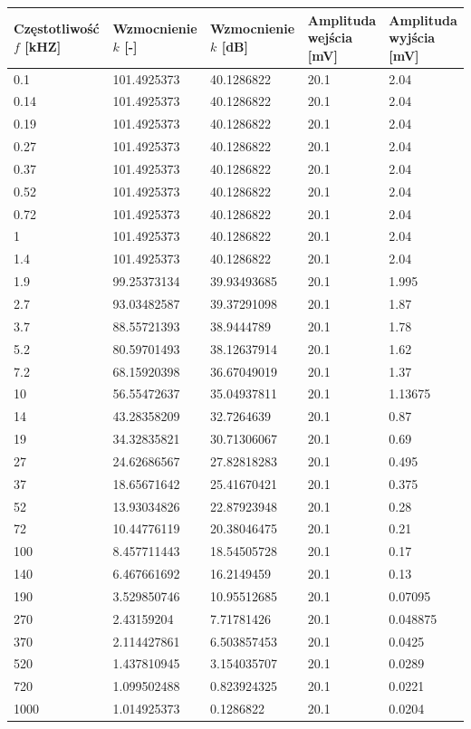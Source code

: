 \documentclass[a4paper,12pt]{article}
\begin{document}
\begin{justify}
\begin{center}
\begin{tabular}{ |p{3cm}|p{3cm}|p{3cm}|p{3cm}|p{3cm}| }
\hline
\makecell{Częstotliwość \\ $f$ [kHZ]} & \makecell{Wzmocnienie \\ $k$ [-]} & \makecell{Wzmocnienie \\ $k$ [dB]} & \makecell{Amplituda \\ wejścia [mV]} & \makecell{Amplituda \\ wyjścia [mV]} \\
\hline
0.1 & 101.4925373 & 40.1286822 & 20.1 & 2.04 \\
0.14 & 101.4925373 & 40.1286822 & 20.1 & 2.04 \\
0.19 & 101.4925373 & 40.1286822 & 20.1 & 2.04 \\
0.27 & 101.4925373 & 40.1286822 & 20.1 & 2.04 \\
0.37 & 101.4925373 & 40.1286822 & 20.1 & 2.04 \\
0.52 & 101.4925373 & 40.1286822 & 20.1 & 2.04 \\
0.72 & 101.4925373 & 40.1286822 & 20.1 & 2.04 \\
1 & 101.4925373 & 40.1286822 & 20.1 & 2.04 \\
1.4 & 101.4925373 & 40.1286822 & 20.1 & 2.04 \\
1.9 & 99.25373134 & 39.93493685 & 20.1 & 1.995 \\
2.7 & 93.03482587 & 39.37291098 & 20.1 & 1.87 \\
3.7 & 88.55721393 & 38.9444789 & 20.1 & 1.78 \\
5.2 & 80.59701493 & 38.12637914 & 20.1 & 1.62 \\
7.2 & 68.15920398 & 36.67049019 & 20.1 & 1.37 \\
10 & 56.55472637 & 35.04937811 & 20.1 & 1.13675 \\
14 & 43.28358209 & 32.7264639 & 20.1 & 0.87 \\
19 & 34.32835821 & 30.71306067 & 20.1 & 0.69 \\
27 & 24.62686567 & 27.82818283 & 20.1 & 0.495 \\
37 & 18.65671642 & 25.41670421 & 20.1 & 0.375 \\
52 & 13.93034826 & 22.87923948 & 20.1 & 0.28 \\
72 & 10.44776119 & 20.38046475 & 20.1 & 0.21 \\
100 & 8.457711443 & 18.54505728 & 20.1 & 0.17 \\
140 & 6.467661692 & 16.2149459 & 20.1 & 0.13 \\
190 & 3.529850746 & 10.95512685 & 20.1 & 0.07095 \\
270 & 2.43159204 & 7.71781426 & 20.1 & 0.048875 \\
370 & 2.114427861 & 6.503857453 & 20.1 & 0.0425 \\
520 & 1.437810945 & 3.154035707 & 20.1 & 0.0289 \\
720 & 1.099502488 & 0.823924325 & 20.1 & 0.0221 \\
1000 & 1.014925373 & 0.1286822 & 20.1 & 0.0204 \\
\hline
\end{tabular}
\end{center}


\end{justify}
\end{document}
